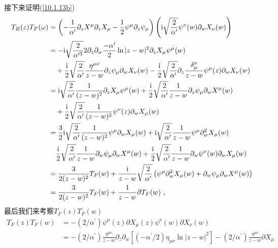 \begin{tcolorbox}
接下来证明(\ref{10.1.13b})%
\begin{align*}
T_{B}(z)T_{F}(\omega ) &=\left( -\frac{1}{\alpha ^{\prime }}\partial
_{z}X^{\mu }\partial _{z}X_{\mu }-\frac{1}{2}\psi ^{\mu }\partial _{z}\psi
_{\mu }\right) \left( \mi\sqrt{\frac{2}{\alpha ^{\prime }}}\psi ^{\nu
}(w)\partial _{w}X_{\nu }(w)\right)  \\
&=-\mi\sqrt{\frac{2}{\alpha ^{\prime 3}}}2\partial _{z}\partial _{w}\frac{%
-\alpha ^{\prime }}{2}\ln |z-w|^{2}\partial _{z}X_{\mu }\psi ^{\mu }(w) \\
&\quad+\frac{\mi}{2}\sqrt{\frac{2}{\alpha ^{\prime }}}\frac{\eta ^{\mu \nu }}{z-w}%
\partial _{z}\psi _{\mu }\partial _{w}X_{\nu }(w)-\frac{\mi}{2}\sqrt{\frac{2}{%
\alpha ^{\prime }}}\partial _{z}\frac{\delta _{\mu }^{\nu }}{z-w}\psi ^{\mu
}(z)\partial _{w}X_{\nu }(w) \\
&=\mi\sqrt{\frac{2}{\alpha ^{\prime }}}\frac{1}{(z-w)^{2}}\partial _{z}X_{\mu
}\psi ^{\mu }(w)+\frac{\mi}{2}\sqrt{\frac{2}{\alpha ^{\prime }}}\frac{1}{z-w}%
\partial _{z}\psi _{\mu }\partial _{w}X^{\mu }(w) \\
&\quad+\frac{\mi}{2}\sqrt{\frac{2}{\alpha ^{\prime }}}\frac{1}{(z-w)^{2}}\psi
^{\nu }(z)\partial _{w}X_{\mu }(w) \\
&=\frac{3}{2}\mi\sqrt{\frac{2}{\alpha ^{\prime }}}\frac{1}{(z-w)^{2}}\psi
^{\mu }\partial _{w}X_{\mu }(w)+\mi\sqrt{\frac{2}{\alpha ^{\prime }}}\frac{1}{%
z-w}\psi ^{\mu }\partial _{w}^{2}X_{\mu }(w) \\
&\quad\frac{\mi}{2}\sqrt{\frac{2}{\alpha ^{\prime }}}\frac{1}{z-w}\partial
_{w}\psi _{\mu }\partial _{w}X^{\mu }(w)+\frac{\mi}{2}\sqrt{\frac{2}{\alpha
^{\prime }}}\frac{1}{z-w}\partial _{w}\psi ^{\nu }(w)\partial _{w}X_{\mu }(w)\\
&=\frac{3}{2(z-w)^{2}}T_{F}(w)+\frac{\mi}{z-w}\sqrt{\frac{2}{\alpha ^{\prime }%
}}\left( \psi ^{\mu }\partial _{w}^{2}X_{\mu }(w)+\partial _{w}\psi _{\mu
}\partial _{w}X^{\mu }(w)\right)  \\
&=\frac{3}{2(z-w)^{2}}T_{F}(w)+\frac{1}{z-w}\partial T_{F}(w)\text{ ,}
\end{align*}
最后我们来考察$T_{F}(z)T_{F}(w)$
\begin{align*}
T_{F}(z)T_{F}(w) &=-(2/\alpha ^{\prime })\psi ^{\mu }(z)\partial X_{\mu
}(z)\psi ^{\nu }(w)\partial X_{\nu }(w) \\
&=-(2/\alpha ^{\prime })\frac{\eta ^{\mu \nu }}{z-w}\partial _{z}\partial
_{w}[(-\alpha ^{\prime }/2)\eta _{\mu \nu }\ln |z-w|^{2}] 
-(2/\alpha ^{\prime })\frac{\eta ^{\mu \nu }}{z-w}\partial X_{\mu
}
\end{align*}
\end{tcolorbox}
